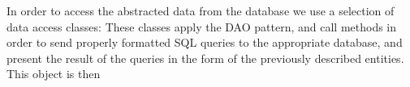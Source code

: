   In order to access the abstracted data from the database we use a selection of data access classes:
  These classes apply the DAO pattern, and call methods in order to send properly formatted SQL queries to the appropriate database, and present the result of the queries in the form of the previously described entities. 
  This object is then 
  
  

  
